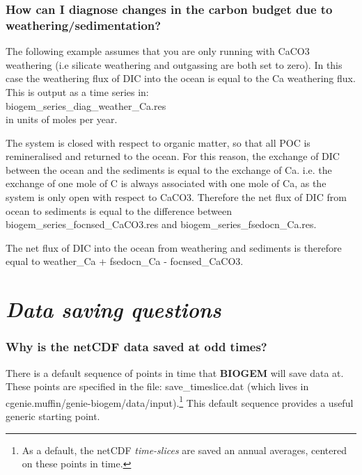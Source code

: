 \documentclass[11pt,fleqn]{book} %
\begin{document}
\subsubsection{How can I diagnose changes in the carbon budget due to weathering/sedimentation?}

The following example assumes that you are only running with CaCO3 weathering (i.e silicate weathering and outgassing are both set to zero). In this case the weathering flux of DIC into the ocean is equal to the Ca weathering flux. This is output as a time series in:
\\\textsf{\footnotesize biogem\_series\_diag\_weather\_Ca.res}
\\\noindent in units of moles per year.

The system is closed with respect to organic matter, so that all POC is remineralised and returned to the ocean. For this reason, the exchange of DIC between the ocean and the sediments is equal to the exchange of Ca. i.e. the exchange of one mole of C is always associated with one mole of Ca, as the system is only open with respect to CaCO3. Therefore the net flux of DIC from ocean to sediments is equal to the difference between biogem\_series\_focnsed\_CaCO3.res and biogem\_series\_fsedocn\_Ca.res.

The net flux of DIC into the ocean from weathering and sediments is therefore equal to weather\_Ca + fsedocn\_Ca - focnsed\_CaCO3.


\newpage


\section{\textit{Data saving questions}}

%
\subsubsection{Why is the netCDF data saved at odd times?}

There is a default sequence of points in time that \textbf{BIOGEM} will save data at. These points are specified in the file: \textsf{\footnotesize save\_timeslice.dat} (which lives in \textsf{\footnotesize cgenie.muffin/genie-biogem/data/input}).\footnote{As a default, the netCDF \textit{time-slices} are saved an annual averages, centered on these points in time.} This default sequence provides a useful generic starting point.
\end{document}
